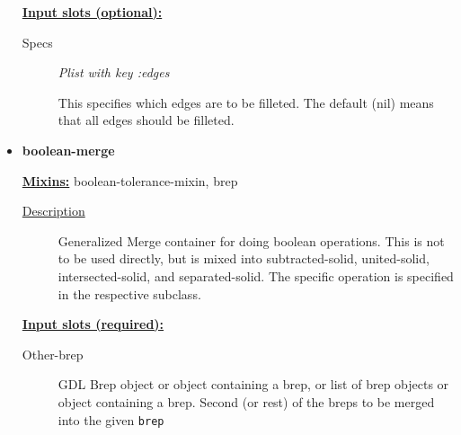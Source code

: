 \documentclass [11pt]{book}
\begin{document}
\begin{itemize}
\textbf{
\underline{Input slots (optional):}}

\begin{description}

\item [Specs]
\emph{Plist with key :edges}

 This specifies which edges are to be filleted. The default (nil)
means that all edges should be filleted.




\end{description}







\item {}
\label{prim:boolean-merge}
\textbf{boolean-merge}


\textbf{
\underline{Mixins:}} boolean-tolerance-mixin, brep





\begin{description}

\item [
\underline{Description}]


Generalized Merge container for doing
boolean operations.  This is not to be used directly, but is mixed
into subtracted-solid, united-solid, intersected-solid, and
separated-solid. The specific operation is specified in the respective
subclass.



\end{description}








\textbf{
\underline{Input slots (required):}}

\begin{description}

\item [Other-brep]

GDL Brep object or object containing a brep, or list of brep
objects or object containing a brep.  Second (or rest) of the breps to
be merged into the given \texttt{brep}




\end{description}







\end{itemize}
\end{document}
